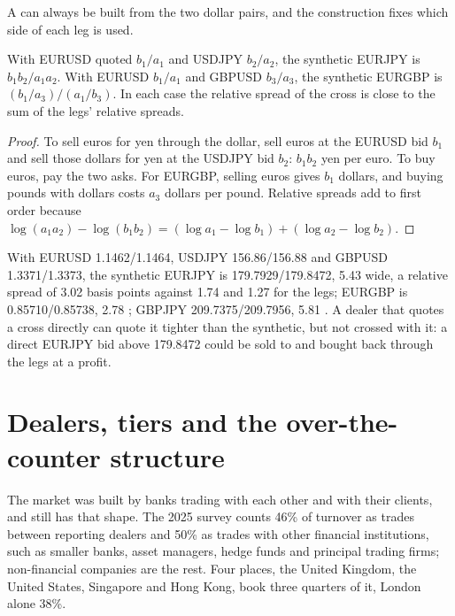 A  can always be built from the two dollar pairs, and the
construction fixes which side of each leg is used.

\begin{proposition}\label{prop:m2:the-fx-market:cross}
With EURUSD quoted $b_1/a_1$ and USDJPY $b_2/a_2$, the synthetic EURJPY is
$b_1b_2 / a_1a_2$. With EURUSD $b_1/a_1$ and GBPUSD $b_3/a_3$, the synthetic
EURGBP is $(b_1/a_3)/(a_1/b_3)$. In each case the relative spread of the cross
is close to the sum of the legs' relative spreads.
\end{proposition}

\begin{proof}
To sell euros for yen through the dollar, sell euros at the EURUSD bid $b_1$ and
sell those dollars for yen at the USDJPY bid $b_2$: $b_1b_2$ yen per euro. To buy
euros, pay the two asks. For EURGBP, selling euros gives $b_1$ dollars, and
buying pounds with dollars costs $a_3$ dollars per pound. Relative spreads add to
first order because $\log(a_1a_2) - \log(b_1b_2) = (\log a_1 - \log b_1) +
(\log a_2 - \log b_2)$.
\end{proof}

\begin{example}\label{ex:m2:the-fx-market:crosses}
With EURUSD 1.1462/1.1464, USDJPY 156.86/156.88 and GBPUSD 1.3371/1.3373, the
synthetic EURJPY is 179.7929/179.8472, 5.43  wide, a relative spread of
3.02 basis points against 1.74 and 1.27 for the legs; EURGBP is
0.85710/0.85738, 2.78 ; GBPJPY 209.7375/209.7956, 5.81 . A dealer that
quotes a cross directly can quote it tighter than the synthetic, but not
crossed with it: a direct EURJPY bid above 179.8472 could be sold to and bought
back through the legs at a profit.
\end{example}

\section{Dealers, tiers and the over-the-counter structure}

The market was built by banks trading with each other and with their clients,
and still has that shape. The 2025 survey counts 46\% of turnover as trades
between reporting dealers and 50\% as trades with other financial institutions,
such as smaller banks, asset managers, hedge funds and principal trading firms;
non-financial companies are the rest. Four places, the United Kingdom, the
United States, Singapore and Hong Kong, book three quarters of it, London alone
38\%.

